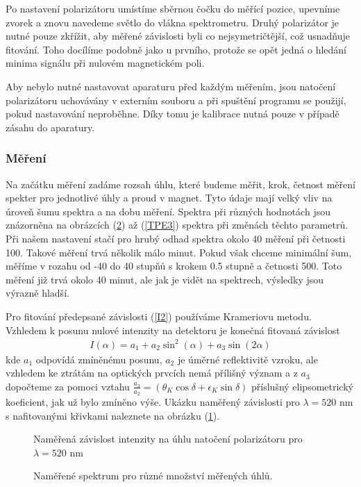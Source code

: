 Po nastavení polarizátoru umístíme sběrnou čočku do měřící pozice, upevníme zvorek a znovu navedeme světlo do vlákna spektrometru.
Druhý polarizátor je nutné pouze zkřížit, aby měřené závislosti byli co nejsymetričtější, což usnadňuje fitování. Toho docílíme podobně jako u prvního, protože se opět jedná o hledání minima signálu při nulovém magnetickém poli.

Aby nebylo nutné nastavovat aparaturu před každým měřením, jsou natočení polarizátoru uchovávány v externím souboru a při spuštění programu se použijí, pokud nastavování neproběhne. Díky tomu je kalibrace nutná pouze v případě zásahu do aparatury. 


\subsubsection{Měření}
Na začátku měření zadáme rozsah úhlu, které budeme měřit, krok, četnost měření spekter pro jednotlivé úhly a proud v magnet. Tyto údaje mají velký vliv na úroveň šumu spektra a na dobu měření. Spektra při různých hodnotách jsou znázorněna na obrázcích (\ref{TPE1}) až (\ref{TPE3}) spektra při změnách těchto parametrů. Při našem nastavení stačí pro hrubý odhad spektra okolo 40 měření při četnosti 100. Takové měření trvá několik málo minut. Pokud však chceme minimální šum, měříme v rozahu od -40 do 40 stupňů s krokem 0.5 stupně a četnosti 500. Toto měření již trvá okolo 40 minut, ale jak je vidět na spektrech, výsledky jsou výrazně hladší.

Pro fitování předepsané závislosti (\ref{I2}) používáme Krameriovu metodu. Vzhledem k posunu nulové intenzity na detektoru je konečná fitovaná závislost
\begin{eqnarray}
I(\alpha)=a_1+a_2\sin^2(\alpha)+a_3\sin(2\alpha)
\end{eqnarray}
kde $a_1$ odpovídá zmíněnému posunu, $a_2$ je úměrné reflektivitě vzroku, ale vzhledem ke ztrátám na optických prvcích nemá přílišný význam a z $a_3$ dopočteme za pomoci vztahu $\frac{a_3}{a_2}=(\theta_K\cos\delta+\epsilon_K\sin\delta)$ příslušný elipsometrický koeficient, jak už bylo zmíněno výše. Ukázku naměřený závislosti pro $\lambda=520$ nm s nafitovanými křivkami naleznete na obrázku (\ref{TPE0}).

\begin{figure}

\caption{Naměřená závislost intenzity na úhlu natočení polarizátoru pro $\lambda =520$ nm}
\label{TPE0}
\end{figure}

\begin{figure}

\caption{Naměřené spektrum pro různé množství měřených úhlů.}
\label{TPE1}
\end{figure}

